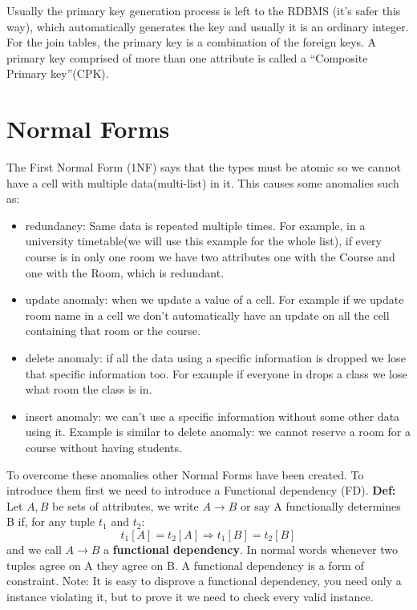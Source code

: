 \documentclass[a4page, 11pt]{article}
\begin{document}
Usually the primary key generation process is left to the RDBMS (it's safer this way), which automatically generates the key and usually it is an ordinary integer.
For the join tables, the primary key is a combination of the foreign keys. A primary key comprised of more than one attribute is called a ``Composite Primary key''(CPK).

\section{Normal Forms}
The First Normal Form (1NF) says that the types must be atomic so we cannot have a cell with multiple data(multi-list) in it. 
This causes some anomalies such as: 
\begin{itemize}[noitemsep]
	\item redundancy: Same data is repeated multiple times. For example, in a university timetable(we will use this example for the whole list), if every course is in only one room we have two attributes one with the Course and one with the Room, which is redundant.
	\item update anomaly: when we update a value of a cell. For example if we update room name in a cell we don't automatically have an update on all the cell containing that room or the course.
	\item delete anomaly: if all the data using a specific information is dropped we lose that specific information too. For example if everyone in drops a class we lose what room the class is in.
	\item insert anomaly: we can't use a specific information without some other data using it. Example is similar to delete anomaly: we cannot reserve a room for a course without having students.
\end{itemize}
To overcome these anomalies other Normal Forms have been created. To introduce them first we need to introduce a Functional dependency (FD). \newline
\textbf{Def:} Let $A,B$ be sets of attributes, we write $A \rightarrow B$ or say A functionally determines B if, for any tuple $t_1$ and $t_2$:
$$t_1[A]=t_2[A] \Rightarrow t_1[B]=t_2[B]$$
and we call $A \rightarrow B$ a \textbf{functional dependency}.\newline
In normal words whenever two tuples agree on A they agree on B.
A functional dependency is a form of constraint.\newline
Note: It is easy to disprove a functional dependency, you need only a instance violating it, but to prove it we need to check every valid instance.
\end{document}
